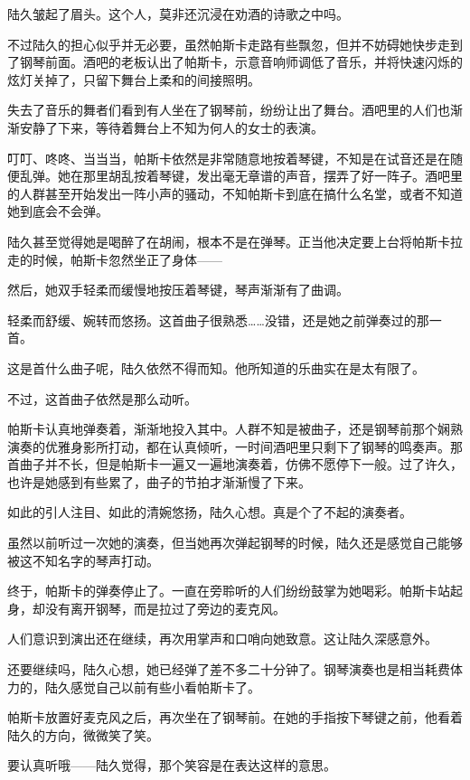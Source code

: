 陆久皱起了眉头。这个人，莫非还沉浸在劝酒的诗歌之中吗。

不过陆久的担心似乎并无必要，虽然帕斯卡走路有些飘忽，但并不妨碍她快步走到了钢琴前面。酒吧的老板认出了帕斯卡，示意音响师调低了音乐，并将快速闪烁的炫灯关掉了，只留下舞台上柔和的间接照明。

失去了音乐的舞者们看到有人坐在了钢琴前，纷纷让出了舞台。酒吧里的人们也渐渐安静了下来，等待着舞台上不知为何人的女士的表演。

叮叮、咚咚、当当当，帕斯卡依然是非常随意地按着琴键，不知是在试音还是在随便乱弹。她在那里胡乱按着琴键，发出毫无章谱的声音，摆弄了好一阵子。酒吧里的人群甚至开始发出一阵小声的骚动，不知帕斯卡到底在搞什么名堂，或者不知道她到底会不会弹。

陆久甚至觉得她是喝醉了在胡闹，根本不是在弹琴。正当他决定要上台将帕斯卡拉走的时候，帕斯卡忽然坐正了身体——

然后，她双手轻柔而缓慢地按压着琴键，琴声渐渐有了曲调。

轻柔而舒缓、婉转而悠扬。这首曲子很熟悉……没错，还是她之前弹奏过的那一首。

这是首什么曲子呢，陆久依然不得而知。他所知道的乐曲实在是太有限了。

不过，这首曲子依然是那么动听。

帕斯卡认真地弹奏着，渐渐地投入其中。人群不知是被曲子，还是钢琴前那个娴熟演奏的优雅身影所打动，都在认真倾听，一时间酒吧里只剩下了钢琴的鸣奏声。那首曲子并不长，但是帕斯卡一遍又一遍地演奏着，仿佛不愿停下一般。过了许久，也许是她感到有些累了，曲子的节拍才渐渐慢了下来。

如此的引人注目、如此的清婉悠扬，陆久心想。真是个了不起的演奏者。

虽然以前听过一次她的演奏，但当她再次弹起钢琴的时候，陆久还是感觉自己能够被这不知名字的琴声打动。

终于，帕斯卡的弹奏停止了。一直在旁聆听的人们纷纷鼓掌为她喝彩。帕斯卡站起身，却没有离开钢琴，而是拉过了旁边的麦克风。

人们意识到演出还在继续，再次用掌声和口哨向她致意。这让陆久深感意外。

还要继续吗，陆久心想，她已经弹了差不多二十分钟了。钢琴演奏也是相当耗费体力的，陆久感觉自己以前有些小看帕斯卡了。

帕斯卡放置好麦克风之后，再次坐在了钢琴前。在她的手指按下琴键之前，他看着陆久的方向，微微笑了笑。

要认真听哦——陆久觉得，那个笑容是在表达这样的意思。

